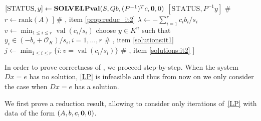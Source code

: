 \documentclass[a4paper,oneside,10pt]{article}
\DeclareMathOperator{\val}{val}
\newcommand{\OK}{\mathcal{O}_K}
\begin{document}
\begin{algorithm}[!ht]
{\begin{algorithmic}[1]
      \STATE $[\mathrm{STATUS}, y] \leftarrow \textbf{SOLVELPval}(S,Qb,(P^{-1})^Tc,{\bf 0},0)$ \label{step:solsLP:end}
      \RETURN $[\mathrm{STATUS}, P^{-1}y]$ \hfill \color{olive} \#  \label{step:solsLP}
      \ENDIF
      \STATE $r \leftarrow \text{rank}(A)$ \label{step:core:begin}
      \IF{$\bigwedge_{i=r+1}^d \val(b_{i}) \geq 0$} \label{step:condition}
      \RETURN [UNBOUND, []] \hfill {\color{olive} \# , item \ref{prop:reduc_it2}} \label{step:unbound}
      \ELSE
      \STATE $\lambda \leftarrow -\sum_{i=1}^r c_i b_i / s_i$
      \STATE $v \leftarrow \min_{1 \leq i \leq r} \val (c_i/s_i)$
      \IF{$\val \lambda < v$}
      \STATE choose $y \in K^n$ such that $y_i \in (-b_i+\OK)/s_i, i=1,\ldots,r$
      \RETURN [FEAS, $y$] \hfill {\color{olive} \# , item \ref{solutions:it1}}
      \ELSE
      \STATE $j \leftarrow \min_{1 \leq i \leq r} \{i : v = \val (c_i/s_i)\}$
      \RETURN [FEAS, ${\bf e}_j$] \hfill {\color{olive} \# , item \ref{solutions:it2}}
      \ENDIF
      \ENDIF 
      \ENDIF 
      \RETURN [INFEAS, []] \label{step:core:end}
    \end{algorithmic}
  }
\end{algorithm}

In order to prove correctness of , we proceed step-by-step.
When the system $Dx=e$ has no solution, \eqref{LP} is infeasible and
thus from now on we only consider the case when $Dx=e$ has a solution.

We first prove a reduction result, allowing to consider only iterations
of~\eqref{LP} with data of the form $(A,b,c,{\bf 0},0)$.
\end{document}
